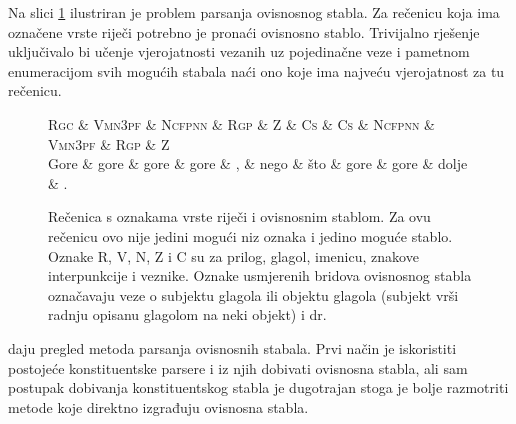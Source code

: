 Na slici \ref{fig:depparsing} ilustriran je problem parsanja ovisnosnog
stabla. Za rečenicu koja ima označene vrste riječi potrebno je pronaći ovisnosno
stablo. Trivijalno rješenje uključivalo bi učenje vjerojatnosti vezanih uz
pojedinačne veze i pametnom enumeracijom svih mogućih stabala naći ono koje ima
najveću vjerojatnost za tu rečenicu.

\begin{figure}
\centering
\begin{dependency}[theme = simple]
\begin{deptext}
  \textsc{Rgc} \& \textsc{Vmn3pf} \& \textsc{Ncfpnn} \& \textsc{Rgp} \& \textsc{Z} \& \textsc{Cs} \& \textsc{Cs} \& \textsc{Ncfpnn} \& \textsc{Vmn3pf} \& \textsc{Rgp} \& \textsc{Z} \\
  Gore         \& gore            \& gore            \& gore         \& ,          \& nego        \& što         \& gore            \& gore            \& dolje        \& .          \\
\end{deptext}
\end{dependency}
\caption[Rečenica s oznakama vrste riječi i ovisnosnim stablom.]{Rečenica s
oznakama vrste riječi i ovisnosnim stablom. Za ovu rečenicu ovo nije jedini
mogući niz oznaka i jedino moguće stablo. Oznake R, V, N, Z i C su za prilog,
glagol, imenicu, znakove interpunkcije i veznike. Oznake usmjerenih bridova
ovisnosnog stabla označavaju veze o subjektu glagola ili objektu glagola
(subjekt vrši radnju opisanu glagolom na neki objekt) i dr.}
\label{fig:depparsing}
\end{figure}

\citet{cer2010parsing} daju pregled metoda parsanja ovisnosnih stabala. Prvi
način je iskoristiti postojeće konstituentske parsere i iz njih dobivati
ovisnosna stabla, ali sam postupak dobivanja konstituentskog stabla je
dugotrajan stoga je bolje razmotriti metode koje direktno izgrađuju ovisnosna
stabla.

